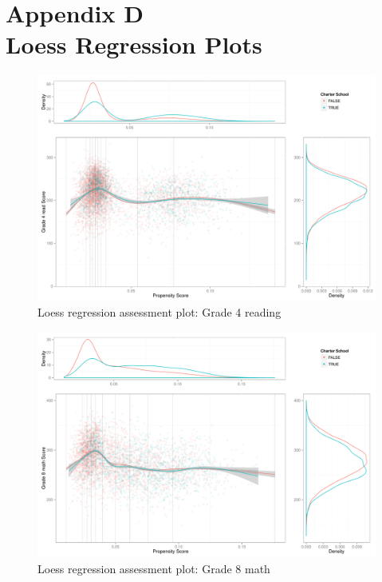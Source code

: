 \clearpage
{}
\section*{Appendix D\\Loess Regression Plots}

\begin{figure}[h!]
\begin{center}
\includegraphics[height=.4\textheight]{../Figures2009/g4read-loess.pdf}
\caption{Loess regression assessment plot: Grade 4 reading}
\label{fig:g4read:loess}
\end{center}
\end{figure}

\begin{figure}[h!]
\begin{center}
\includegraphics[height=.4\textheight]{../Figures2009/g8math-loess.pdf}
\caption{Loess regression assessment plot: Grade 8 math}
\label{fig:g8math:loess}
\end{center}
\end{figure}

